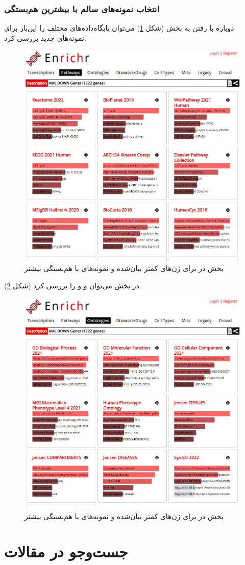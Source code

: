 \documentclass{article}
\begin{document}
\subsubsection{انتخاب نمونه‌های سالم با بیشترین هم‌بستگی}
دوباره با رفتن به بخش  (شکل \ref{fig:enrichr-pathways-d-2}) می‌توان پایگاه‌داده‌های  مختلف را این‌بار برای نمونه‌های جدید بررسی کرد.
\begin{figure}[h!]
	\centering
	\includegraphics[width=0.5\columnwidth]{figs/enrichr-pathways-d-2.jpg}
	\caption{بخش  در  برای ژن‌های کمتر بیان‌شده و نمونه‌های با هم‌بستگی بیشتر}
	\label{fig:enrichr-pathways-d-2}
\end{figure}

در بخش  می‌توان  و  و  را بررسی کرد (شکل \ref{fig:enrichr-ontology-d-2}).
\begin{figure}[h!]
	\centering
	\includegraphics[width=0.5\columnwidth]{figs/enrichr-ontologies-d-2.jpg}
	\caption{بخش  در  برای ژن‌های کمتر بیان‌شده و نمونه‌های با هم‌بستگی بیشتر}
	\label{fig:enrichr-ontology-d-2}
\end{figure}

\section{جست‌و‌جو در مقالات}
\end{document}
